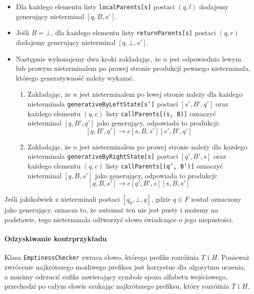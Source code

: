 \begin{itemize}
    \item Dla każdego elementu listy \texttt{localParents[s]} postaci $(q, l)$ dodajemy generujący nieterminal $[q, B, s']$.
    \item Jeśli $B = \bot$, dla każdego elementu listy \texttt{returnParents[s]} postaci $(q, r)$ dodajemy generujący nieterminal $[q, \bot, s']$.
    \item Następnie wykonujemy dwa kroki zakładając, że $n$ jest odpowiednio lewym lub prawym 
        nieterminalem po prawej stronie produkcji pewnego nieterminala, którego generatywność należy wykazać.

        \begin{enumerate}
            \item Zakładając, że $n$ jest nieterminalem po lewej stronie należy dla każdego nieterminala \texttt{generativeByLeftState[s']}
                postaci $[s', B', q']$ oraz każdego elementu $(q, c)$ listy \texttt{callParents[(s, B)]} oznaczyć nieterminal
                $[q, B', q']$ jako generujący, odpowiada to produkcji:
                $$[q, B', q'] \rightarrow c[s, B, s'][s', B', q']$$

            \item Zakładając, że $n$ jest nieterminalem po prawej stronie należy dla każdego nieterminala \texttt{generativeByRightState[s]}
                postaci $[q', B', s]$ oraz każdego elementu $(q, c)$ listy \texttt{callParents[(q', B')]} oznaczyć nieterminal
                $[q, B, s']$ jako generujący, odpowiada to produkcji:
                $$[q, B, s'] \rightarrow c[q', B', s][s, B, s']$$
        \end{enumerate}
\end{itemize}

Jeśli jakikolwiek z nieterminali postaci $[q_0, \bot, q]$, gdzie $q \in F$ został oznaczony jako generujący, oznacza to,
że automat ten nie jest pusty i możemy na podstawie, tego nieterminala odtworzyć słowo świadczące o jego niepustości.

\paragraph{Odzyskiwanie kontrprzykładu}
Klasa \texttt{EmptinessChecker} zwraca słowo, którego prefiks rozróżnia $T$ i $H$. Ponieważ zwrócenie najkrótszego możliwego prefiksu jest
korzystne dla algorytmu uczenia, a musimy odrzucić sufiks zawierający symbole spoza alfabetu wejściowego,
przechodzi po całym słowie szukając najkrótszego prefiksu, który rozróżnia $T$ i $H$.

